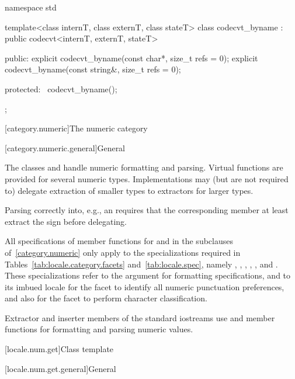 %
\begin{codeblock}
namespace std {
  template<class internT, class externT, class stateT>
  class codecvt_byname : public codecvt<internT, externT, stateT> {
  public:
    explicit codecvt_byname(const char*, size_t refs = 0);
    explicit codecvt_byname(const string&, size_t refs = 0);

  protected:
    ~codecvt_byname();
  };
}
\end{codeblock}

[category.numeric]{The numeric category}

[category.numeric.general]{General}

\pnum
The classes  and 
handle numeric formatting and parsing.
Virtual functions are provided for several numeric types.
Implementations may (but are not required to) delegate
extraction of smaller types to extractors for larger types.
\begin{footnote}
Parsing  correctly into, e.g., an 
requires that the corresponding member 
at least extract the sign before delegating.
\end{footnote}

\pnum
All specifications of member functions for  and 
in the subclauses of~\ref{category.numeric} only apply to
the specializations required in Tables~\ref{tab:locale.category.facets}
and~\ref{tab:locale.spec}, namely
,
,
,
,
, and
.
These specializations refer to the  argument for
formatting specifications,
and to its imbued locale for the  facet to
identify all numeric punctuation preferences,
and also for the  facet to perform character classification.

\pnum
Extractor and inserter members of the standard iostreams use
 and  member functions for
formatting and parsing
numeric values.

[locale.num.get]{Class template }

[locale.num.get.general]{General}

